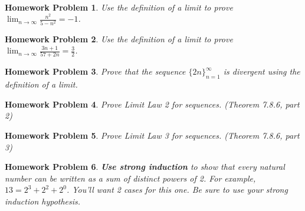 \documentclass{article}
\newtheorem{hw}{Homework Problem}
\newcommand{\ds}{\displaystyle}
\begin{document}
	\
	\begin{hw}
		Use the definition of a limit to prove $\ds \lim_{n \rightarrow \infty} \frac{n^2}{5-n^2} = -1$.
	\end{hw}
	\begin{hw}
		Use the definition of a limit to prove $\ds \lim_{n \rightarrow \infty} \frac{3n+1}{57+2n} = \frac{3}{2}$.
	\end{hw}
	\begin{hw}
		Prove that the sequence $\{ 2n \}_{n=1}^{\infty}$ is divergent using the definition of a limit.
	\end{hw}
	\begin{hw}
		Prove Limit Law 2 for sequences. (Theorem 7.8.6, part 2)
	\end{hw}
	\begin{hw}
		Prove Limit Law 3 for sequences. (Theorem 7.8.6, part 3)
	\end{hw}

	\begin{hw}  {\bf Use strong induction} to show that every natural number can be written as a sum of distinct powers of 2. For example, $13=2^3 + 2^2 + 2^0$. You'll want 2 cases for this one. Be sure to use your strong induction hypothesis.
	\end{hw}

	\
\end{document}
